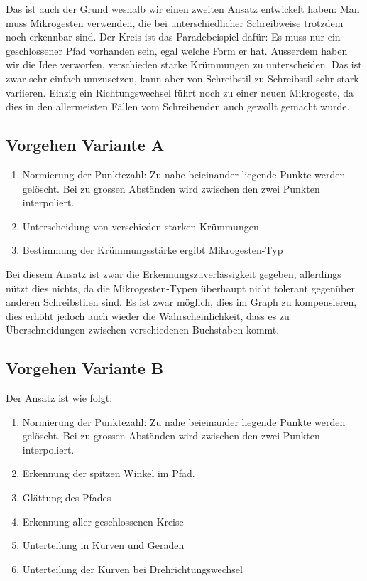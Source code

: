 Das ist auch der Grund weshalb wir einen zweiten Ansatz entwickelt haben: Man muss Mikrogesten verwenden, die bei unterschiedlicher Schreibweise trotzdem noch erkennbar sind. Der Kreis ist das Paradebeispiel dafür: Es muss nur ein geschlossener Pfad vorhanden sein, egal welche Form er hat. Ausserdem haben wir die Idee verworfen, verschieden starke Krümmungen zu unterscheiden. Das ist zwar sehr einfach umzusetzen, kann aber von Schreibstil zu Schreibstil sehr stark variieren. Einzig ein Richtungswechsel führt noch zu einer neuen Mikrogeste, da dies in den allermeisten Fällen vom Schreibenden auch gewollt gemacht wurde.

\subsection{Vorgehen Variante A}
\begin{enumerate}
	\item Normierung der Punktezahl: Zu nahe beieinander liegende Punkte werden gelöscht. Bei zu grossen Abständen wird zwischen den zwei Punkten interpoliert.
	\item Unterscheidung von verschieden starken Krümmungen
	\item Bestimmung der Krümmungsstärke ergibt Mikrogesten-Typ
\end{enumerate}

Bei diesem Ansatz ist zwar die Erkennungszuverlässigkeit gegeben, allerdings nützt dies nichts, da die Mikrogesten-Typen überhaupt nicht tolerant gegenüber anderen Schreibstilen sind. Es ist zwar möglich, dies im Graph zu kompensieren, dies erhöht jedoch auch wieder die Wahrscheinlichkeit, dass es zu Überschneidungen zwischen verschiedenen Buchstaben kommt.

\subsection{Vorgehen Variante B}
Der Ansatz ist wie folgt:
\begin{enumerate}
	\item Normierung der Punktezahl: Zu nahe beieinander liegende Punkte werden gelöscht. Bei zu grossen Abständen wird zwischen den zwei Punkten interpoliert.
	\item Erkennung der spitzen Winkel im Pfad.
	\item Glättung des Pfades
	\item Erkennung aller geschlossenen Kreise 
	\item Unterteilung in Kurven und Geraden
	\item Unterteilung der Kurven bei Drehrichtungswechsel
\end{enumerate}

